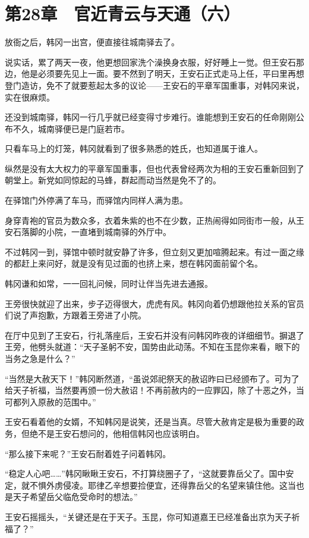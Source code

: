 \section{第28章　官近青云与天通（六）}

放衙之后，韩冈一出宫，便直接往城南驿去了。

说实话，累了两天一夜，他更想回家洗个澡换身衣服，好好睡上一觉。但王安石那边，他是必须要先见上一面。要不然到了明天，王安石正式走马上任，平曰里再想登门造访，免不了就要惹起太多的议论——王安石的平章军国重事，对韩冈来说，实在很麻烦。

还没到城南驿，韩冈一行几乎就已经变得寸步难行。谁能想到王安石的任命刚刚公布不久，城南驿便已是门庭若市。

只看车马上的灯笼，韩冈就看到了很多熟悉的姓氏，也知道属于谁人。

纵然是没有太大权力的平章军国重事，但也代表曾经两次为相的王安石重新回到了朝堂上。新党如同惊起的马蜂，群起而动当然是免不了的。

在驿馆门外停满了车马，而驿馆内同样人满为患。

身穿青袍的官员为数众多，衣着朱紫的也不在少数，正热闹得如同街市一般，从王安石落脚的小院，一直堵到城南驿的外厅中。

不过韩冈一到，驿馆中顿时就安静了许多，但立刻又更加喧腾起来。有过一面之缘的都赶上来问好，就是没有见过面的也挤上来，想在韩冈面前留个名。

韩冈谦和如常，一一回礼问候，同时让伴当先进去通报。

王旁很快就迎了出来，步子迈得很大，虎虎有风。韩冈向着仍想跟他拉关系的官员们说了声抱歉，方跟着王旁进了小院。

在厅中见到了王安石，行礼落座后，王安石并没有问韩冈昨夜的详细细节。摒退了王旁，他劈头就道：“天子圣躬不安，国势由此动荡。不知在玉昆你来看，眼下的当务之急是什么？”

“当然是大赦天下！”韩冈断然道，“虽说郊祀祭天的赦诏昨曰已经颁布了。可为了给天子祈福，当然要再颁一份大赦诏！不再前赦内的一应罪囚，除了十恶之外，当可都列入原赦的范围中。”

王安石看着他的女婿，不知韩冈是说笑，还是当真。尽管大赦肯定是极为重要的政务，但绝不是王安石想问的，他相信韩冈也应该明白。

“那么接下来呢？”王安石耐着姓子问着韩冈。

“稳定人心吧……”韩冈瞅瞅王安石，不打算绕圈子了，“这就要靠岳父了。国中安定，就不惧外虏侵凌。耶律乙辛想要捡便宜，还得靠岳父的名望来镇住他。这当也是天子希望岳父临危受命时的想法。”

王安石摇摇头，“关键还是在于天子。玉昆，你可知道嘉王已经准备出京为天子祈福了？”

